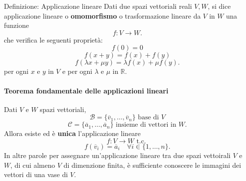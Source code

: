 \documentclass[x11names]{article}
\begin{document}
\begin{center}
\colorbox{Azure2}{\begin{minipage}{5.75in}
\begin{blues}{Definizione: Applicazione lineare}
	Dati due spazi vettoriali reali $V,W$, si dice applicazione lineare o \textbf{omomorfismo} o trasformazione lineare da $V$ in  $W$ una funzione
\[
f: V \longrightarrow W 
.\] 
che verifica le seguenti proprietà:
\[
f\left(0\right) = 0
\] 
\[
f\left(x+y\right) = f\left(x\right) + f\left(y\right)
\] 
\[
f\left(\lambda x + \mu y\right) = \lambda f\left(x\right) + \mu f\left(y\right) 
.\] 
per ogni $x$ e  $y$ in $V$ e per ogni $\lambda$ e $\mu$ in $\mathbb{R}$.
\end{blues}
\end{minipage}}        
\end{center}





\begin{center}
\colorbox{Bisque1}{\begin{minipage}{5.75in}
\begin{yes1}{}
\paragraph{Teorema fondamentale delle applicazioni lineari }
Dati $V$ e  $W$ spazi vettoriali,
\[
\mathscr{B} = \{\overline{v}_{1},\dots,\overline{v}_{n}\} \text{ base di }V
\] 
\[
\mathscr{C} = \{\overline{a}_{1},\dots,\overline{a}_{n}\} \text{ insieme di vettori in }W
.\] 
Allora esiste ed è \textbf{unica} l'applicazione lineare
\[
f: V \longrightarrow W \text{ t.c. }
\] 
\[
f\left(\overline{v}_{i}\right) = \overline{a}_{i} \quad \forall i \in \{1,\dots,n\}
.\] 
In altre parole per assegnare un'applicazione lineare tra due spazi vettoirali $V$ e $W$, di cui almeno $V$ di dimenzione finita, è sufficiente conoscere le immagini dei vettori di una vase di $V$.
\end{yes1}
\end{minipage}}        
\end{center}
\end{document}

